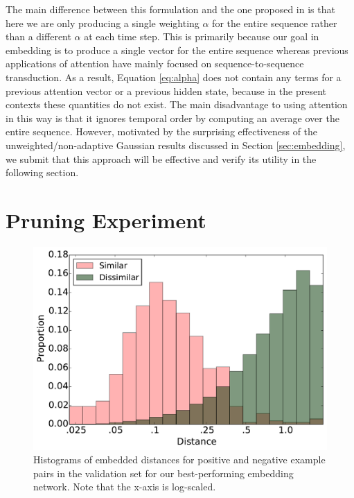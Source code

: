 \documentclass{article}
\begin{document}
The main difference between this formulation and the one proposed in \cite{bahdanau2014neural, cho2015describing} is that here we are only producing a single weighting $\alpha$ for the entire sequence rather than a different $\alpha$ at each time step.
This is primarily because our goal in embedding is to produce a single vector for the entire sequence whereas previous applications of attention have mainly focused on sequence-to-sequence transduction.
As a result, Equation \ref{eq:alpha} does not contain any terms for a previous attention vector or a previous hidden state, because in the present contexts these quantities do not exist.
The main disadvantage to using attention in this way is that it ignores temporal order by computing an average over the entire sequence.
However, motivated by the surprising effectiveness of the unweighted/non-adaptive Gaussian results discussed in Section \ref{sec:embedding}, we submit that this approach will be effective and verify its utility in the following section.

\section{Pruning Experiment}
\label{sec:experiment}

\begin{figure}[t]
  \centering
  \includegraphics[width=\columnwidth]{distances.pdf}
  \caption{Histograms of embedded distances for positive and negative example pairs in the validation set for our best-performing embedding network.  Note that the x-axis is log-scaled.}
  \label{fig:distances}
\end{figure}
\end{document}

